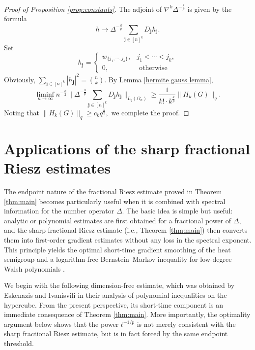 \documentclass{amsart}
\numberwithin{equation}{section}
\theoremstyle{definition}
\theoremstyle{remark}
\newcommand{\1}{\mathbf 1}
\begin{document}
\begin{proof}[Proof of Proposition \ref{prop:constants}] The adjoint of
$\nabla^k\Delta^{-\frac{k}{p}}$ is given by the formula
$$h\to \Delta^{-\frac{k}{p}}\sum_{\mathbf{j}\in [n]^{k}}D_{\mathbf{j}}h_{\mathbf{j}}.$$
Set
$$h_{\mathbf{j}}=
\begin{cases}
w_{\{j_1,\cdots,j_k\}},&j_1<\cdots<j_k,\\
0,&\mbox{ otherwise}
 \end{cases}$$
Obviously, $\sum_{\mathbf{j}\in [n]^k}|h_{\mathbf{j}}|^2=\binom{n}{k}.$ By Lemma \ref{hermite gauss lemma},
$$\liminf_{n\to\infty}n^{-\frac{k}{2}}\|\Delta^{-\frac{k}{p}}\sum_{\mathbf{j}\in [n]^{k}}D_{\mathbf{j}}h_{\mathbf{j}}\|_{L_q(\Omega_n)}\geq \frac1{k!\cdot k^{\frac{k}{p}}}\|H_k(G)\|_q.$$
Noting that $\|H_k(G)\|_q\geq c_kq^{\frac{k}{2}},$ we complete the proof.
\end{proof}



\section{Applications of the sharp fractional Riesz estimates}\label{sec:applications}


The endpoint nature of the fractional Riesz estimate proved in Theorem \ref{thm:main} becomes particularly useful when it is combined with spectral information for the number operator $\Delta$.  The basic idea is simple but useful: analytic or polynomial estimates are first obtained for a fractional power of $\Delta$, and the sharp fractional Riesz estimate (i.e., Theorem \ref{thm:main}) then converts them into first-order gradient estimates without any loss in the spectral exponent.  This principle yields  the optimal short-time gradient smoothing of the heat semigroup \cite{E-I2020} and a logarithm-free Bernstein--Markov inequality for low-degree Walsh polynomials \cite{V2024}.  

We begin with the following dimension-free estimate, which was obtained by Eskenazis and Ivanisvili \cite{E-I2020} in their analysis of polynomial inequalities on the hypercube. From the present perspective, its short-time component is an immediate consequence of Theorem \ref{thm:main}. More importantly, the optimality argument below shows that the power $t^{-1/p}$ is not merely consistent with the sharp fractional Riesz estimate, but is in fact forced by the same endpoint threshold.
\end{document}
